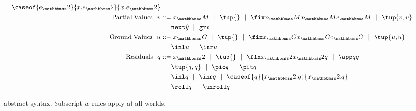 \begin{figure}
\begin{abstrsyn}
\[\begin{aligned}
 \gbar \caseof {\exprT}{\var.\exprT}{\var.\exprT} \\ 
\text{Partial Values}\ \ 
v &::= \varM
 \gbar\tup{}
 \gbar \fix \varM \varM \exprM
 \gbar \tup{v, v} \\
&\gbar \next {\hat y} 
 \gbar \pure v \\
\text{Ground Values}\ \ 
u &::= \varG
 \gbar\tup{}
 \gbar \fix \varG \varG \exprG
 \gbar \tup{u, u} \\
&\gbar \inl u 
 \gbar \inr u \\
\text{Residuals}\ \ 
q &::= \varT
 \gbar \tup{}
 \gbar \fix \varT \varT q
 \gbar \app q q \\
&\gbar \tup{q, q} 
 \gbar \pio q 
 \gbar \pit q \\
&\gbar \inl q 
 \gbar \inr q
 \gbar \caseof {q}{\varT.q}{\varT.q} \\
&\gbar \roll q
 \gbar \unroll q\\
\end{aligned}\]
\end{abstrsyn}
\caption{\lang\ abstract syntax. Subscript-$w$ rules apply at all worlds.}
\label{fig:grammar}
\end{figure}

